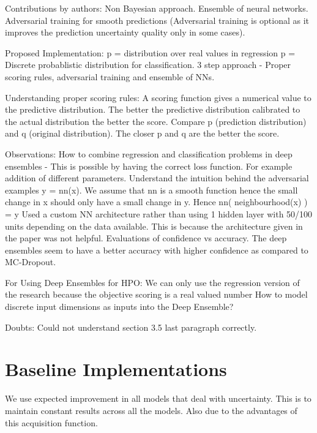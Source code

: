 \documentclass[11pt]{report}
\begin{document}
Contributions by authors:
    Non Bayesian approach.
    Ensemble of neural networks.
    Adversarial training for smooth predictions (Adversarial training is optional as it improves the prediction uncertainty quality only in some cases).


Proposed Implementation:
    p = distribution over real values in regression
    p = Discrete probablistic distribution for classification.
%
    3 step approach - Proper scoring rules, adversarial training and ensemble of NNs.

Understanding proper scoring rules:
    A scoring function gives a numerical value to the predictive distribution.
    The better the predictive distribution calibrated to the actual distribution the better the score.
    Compare p (prediction distribution) and q (original distribution). The closer p and q are the better the score.

Observations:
   How to combine regression and classification problems in deep ensembles - This is possible by having the correct loss function. For example addition of different parameters.
   Understand the intuition behind the adversarial examples y = nn(x). We assume that nn is a smooth function hence the small
   change in x should only have a small change in y. Hence nn( neighbourhood(x) ) = y
   Used a custom NN architecture rather than using 1 hidden layer with 50/100 units depending on the data available.
   This is because the architecture given in the paper was not helpful.
%
Evaluations of confidence vs accuracy.
    The deep ensembles seem to have a better accuracy with higher confidence as compared to MC-Dropout.

For Using Deep Ensembles for HPO:
    We can only use the regression version of the research because the objective scoring is a real valued number
    How to model discrete input dimensions as inputs into the Deep Ensemble?

Doubts:
    Could not understand section 3.5 last paragraph correctly.

\chapter{Baseline Implementations}
We use expected improvement in all models that deal with uncertainty.
This is to maintain constant results across all the models.
Also due to the advantages of this acquisition function.
\end{document}
